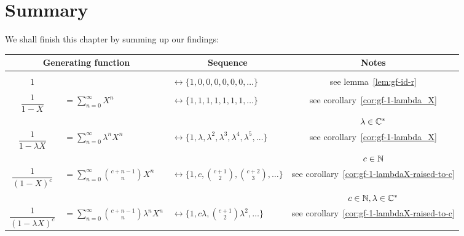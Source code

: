 \documentclass[a4paper, 12pt]{report}
\begin{document}
\section{Summary}\label{sec:gf-summary}
We shall finish this chapter by summing up our findings:
\begin{table}[h!]
    \centering
    \begin{tabular}{c l l | c}
    \multicolumn{2}{c}{\textbf{Generating function}} & \multicolumn{1}{c}{\textbf{Sequence}} & \textbf{Notes}\\\hline
    
    &&&\\
    $1$ 
    & 
    & $\longleftrightarrow \{1, 0, 0, 0, 0, 0, 0, \dots\}$ 
    &see lemma~\ref{lem:gf-id-r}\\
    
    &&&\\
    $\dfrac{1}{1 - X}$ 
    & $= \sum_{n = 0}^\infty X^n$ 
    & $\longleftrightarrow \{1, 1, 1, 1, 1, 1, 1, \dots\}$ 
    &see corollary~\ref{cor:gf-1-lambda_X}\\
    
    &&&$\lambda \in \mathbb{C}^*$\\
    $\dfrac{1}{1 - \lambda X}$ 
    & $= \sum_{n = 0}^\infty \lambda^n X^n$ 
    & $\longleftrightarrow \{1, \lambda, \lambda^2, \lambda^3, \lambda^4, \lambda^5, \dots\}$ 
    &see corollary~\ref{cor:gf-1-lambda_X}\\
    
    
    &&&$c \in \mathbb{N}$\\
    $\dfrac{1}{(1 - X)^c}$
    & $= \sum_{n = 0}^{\infty} \binom{c + n - 1}{n} X^n$
    & $\longleftrightarrow \{1, c, \binom{c + 1}{2}, \binom{c + 2}{3}, \dots\}$
    & see corollary~\ref{cor:gf-1-lambdaX-raised-to-c}\\
    
    &&&$c \in \mathbb{N}, \lambda \in \mathbb{C}^*$\\
    $\dfrac{1}{(1 - \lambda X)^c}$
    & $= \sum_{n = 0}^{\infty} \binom{c + n - 1}{n} \lambda^n X^n$
    & $\longleftrightarrow \{1, c \lambda, \binom{c + 1}{2} \lambda^2, \dots\}$
    & see corollary~\ref{cor:gf-1-lambdaX-raised-to-c}
    
    \end{tabular}
    \label{tab:my_label}
\end{table}
\end{document}
